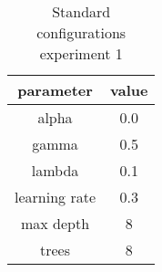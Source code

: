\begin{table}
\centering
\begin{tabular}{| c|c|}
\hline\hline
parameter & value\\
\hline
alpha & 0.0\\\hline
gamma & 0.5\\\hline
lambda & 0.1\\\hline
learning rate & 0.3\\\hline
max depth & 8\\\hline
trees & 8\\\hline

\end{tabular}\caption{Standard configurations experiment 1} 
\label{tab:./Table/config experiment1_targetandshadow}
\end{table}
